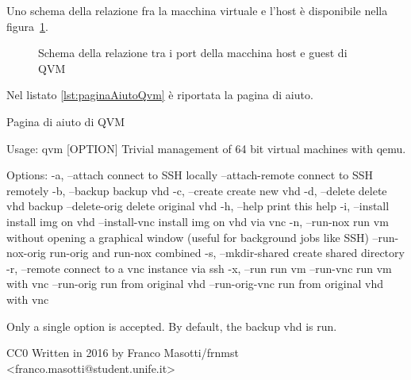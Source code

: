 \documentclass[10pt,titlepage,twoside,a4paper]{report}
\newenvironment{code}{\singlespacing\captionsetup{type=listing}}{}
\begin{document}
Uno schema della relazione fra la macchina virtuale e l'host è disponibile 
nella figura~\ref{fig:schemaPortsQvm}.

\begin{figure}[H]
\centering
\caption{Schema della relazione tra i port della macchina host e guest di QVM}
\label{fig:schemaPortsQvm}
\end{figure}

Nel listato \ref{lst:paginaAiutoQvm} è riportata la pagina di aiuto.

\begin{code}
    \caption{Pagina di aiuto di QVM}
    \label{lst:paginaAiutoQvm}
    \begin{textcode*}{}
Usage: qvm [OPTION]
Trivial management of 64 bit virtual machines with qemu.

Options:
    -a, --attach                connect to SSH locally
        --attach-remote         connect to SSH remotely
    -b, --backup                backup vhd
    -c, --create                create new vhd
    -d, --delete                delete vhd backup
        --delete-orig           delete original vhd
    -h, --help                  print this help
    -i, --install               install img on vhd
        --install-vnc           install img on vhd via vnc
    -n, --run-nox               run vm without opening a graphical window
                                (useful for background jobs like SSH)
        --run-nox-orig          run-orig and run-nox combined
    -s, --mkdir-shared          create shared directory
    -r, --remote                connect to a vnc instance via ssh
    -x, --run                   run vm
        --run-vnc               run vm with vnc
        --run-orig              run from original vhd
        --run-orig-vnc          run from original vhd with vnc


Only a single option is accepted.
By default, the backup vhd is run.

CC0
Written in 2016 by Franco Masotti/frnmst <franco.masotti@student.unife.it>
    \end{textcode*}
\end{code}
\end{document}
